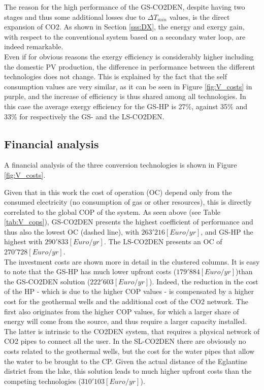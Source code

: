 \documentclass{article}
\begin{document}


The reason for the high performance of the GS-CO2DEN, despite having two stages and thus some additional losses due to $\Delta T_{min}$ values, is the direct expansion of CO2. As shown in Section \ref{sss:DX}, the energy and exergy gain, with respect to the conventional system based on a secondary water loop, are indeed remarkable.\\

Even if for obvious reasons the exergy efficiency is considerably higher including the domestic PV production, the difference in performance between the different technologies does not change. This is explained by the fact that the self consumption values are very similar, as it can be seen in Figure \ref{fig:V_costs} in purple, and the increase of efficiency is thus shared among all technologies. In this case the average exergy efficiency for the GS-HP is 27\%, against 35\% and 33\% for respectively the GS- and the LS-CO2DEN.


\subsection{Financial analysis}

A financial analysis of the three conversion technologies is shown in Figure \ref{fig:V_costs}. 

Given that in this work the cost of operation (OC) depend only from the consumed electricity (no consumption of gas or other resources), this is directly correlated to the global COP of the system. As seen above (see Table \ref{tab:V_cops}), GS-CO2DEN presents the highest coefficient of performance and thus also the lowest OC (dashed line), with $263'216[Euro/yr]$, and GS-HP the highest with $290'833[Euro/yr]$. The LS-CO2DEN presents an OC of $270'728[Euro/yr]$.\\

The investment costs are shown more in detail in the clustered columns. It is easy to note that the GS-HP has much lower upfront costs ($179'884[Euro/yr]$)than the GS-CO2DEN solution ($222'603[Euro/yr]$). Indeed, the reduction in the cost of the HP - which is due to the higher COP values - is compensated by a higher cost for the geothermal wells and the additional cost of the CO2 network. The first also originates from the higher COP values, for which a larger share of energy will come from the source, and thus require a larger capacity installed. The latter is intrinsic to the CO2DEN system, that requires a physical network of CO2 pipes to connect all the user. In the SL-CO2DEN there are obviously no costs related to the geothermal wells, but the cost for the water pipes that allow the water to be brought to the CP. Given the actual distance of the Eglantine district from the lake, this solution leads to much higher upfront costs than the competing technologies ($310'103[Euro/yr]$).\\
\end{document}
